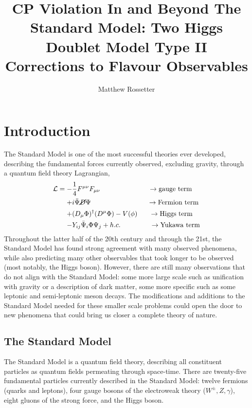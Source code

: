 \documentclass[a4paper,12pt]{article}
\title{CP Violation In and Beyond The Standard Model: Two Higgs Doublet Model Type II Corrections to Flavour Observables}
\author{Matthew Rossetter}
\affiliation{Supervised By Alexander Lenz}
\affiliation{MPhys Theoretical Physics, Durham University}
\begin{document}
 
\maketitle

\section{Introduction}
The Standard Model is one of the most successful theories ever developed, describing the fundamental forces currently observed, excluding gravity, through a quantum field theory Lagrangian, 
\begin{equation}
    \label{eq:sm}
    \begin{split}
        \mathcal{L} = -&\frac14 F^{\mu\nu}F_{\mu\nu} \qquad\qquad\qquad\quad\to \text{gauge term}\\
                      +& i\bar{\Psi}\cancel{D}\Psi \qquad\qquad\qquad\qquad\;\to \text{Fermion term} \\
                      +& (D_\mu\Phi)^\dagger(D^\mu\Phi) - V(\phi) \quad\;\;\,\to \text{Higgs term}\\
                      -& Y_{ij}\bar{\Psi}_i\Phi\Psi_j + h.c. \qquad\qquad\;\to\text{Yukawa term}
    \end{split}
\end{equation}
Throughout the latter half of the 20th century and through the 21st, the Standard Model has found strong agreement with many observed phenomena, while also predicting many other observables that took longer to be observed (most notably, the Higgs boson).
However, there are still many observations that do not align with the Standard Model: some more large scale such as unification with gravity or a description of dark matter, some more specific such as some leptonic and semi-leptonic meson decays.
The modifications and additions to the Standard Model needed for these smaller scale problems could open the door to new phenomena that could bring us closer a complete theory of nature. 

\subsection{The Standard Model}
The Standard Model is a quantum field theory, describing all constituent particles as quantum fields permeating through space-time. 
There are twenty-five fundamental particles currently described in the Standard Model: twelve fermions (quarks and leptons), four gauge bosons of the electroweak theory ($W^\pm,Z,\gamma$), eight gluons of the strong force, and the Higgs boson.
\end{document}
